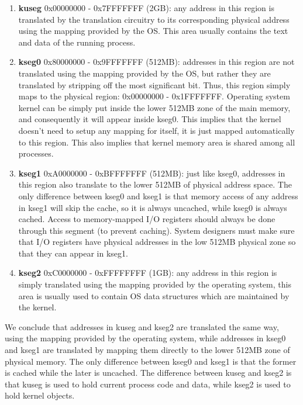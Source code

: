 \documentclass[]{scrartcl}
\begin{document}
\begin{enumerate}

\item \textbf{kuseg} 0x00000000 - 0x7FFFFFFF (2GB): 
      any address in this region is translated by the translation 
      circuitry to its corresponding physical address using the 
      mapping provided by the OS. This area usually contains the 
      text and data of the running process.

\item \textbf{kseg0} 0x80000000 - 0x9FFFFFFF (512MB): 
      addresses in this region are not translated using the
      mapping provided by the OS, but rather they are translated
      by stripping off the most significant bit. Thus, this
      region simply maps to the physical region: 
      0x00000000 - 0x1FFFFFFF. Operating system kernel can
      be simply put inside the lower 512MB zone of the
      main memory, and consequently it will appear inside kseg0.
      This implies that the kernel doesn't need to setup
      any mapping for itself, it is just mapped automatically
      to this region. This also implies that kernel memory
      area is shared among all processes.

\item \textbf{kseg1} 0xA0000000 - 0xBFFFFFFF (512MB):
      just like kseg0, addresses in this region also translate
      to the lower 512MB of physical address space. The only
      difference between kseg0 and kseg1 is that memory access
      of any address in kseg1 will skip the cache, so it is
      always uncached, while kseg0 is always cached. Access
      to memory-mapped I/O registers should always be done
      through this segment (to prevent caching). System
      designers must make sure that I/O registers have
      physical addresses in the low 512MB physical zone so that
      they can appear in kseg1.

\item \textbf{kseg2} 0xC0000000 - 0xFFFFFFFF (1GB):
      any address in this region is simply translated
      using the mapping provided by the operating system,
      this area is usually used to contain OS data structures
      which are maintained by the kernel.

\end{enumerate}

We conclude that addresses in kuseg and kseg2 are translated
the same way, using the mapping provided by the operating system,
while addresses in kseg0 and kseg1 are translated by mapping them
directly to the lower 512MB zone of physical memory. The only
difference between kseg0 and kseg1 is that the former is cached
while the later is uncached. The difference between kuseg and kseg2
is that kuseg is used to hold current process code and data,
while kseg2 is used to hold kernel objects.\\
\end{document}

